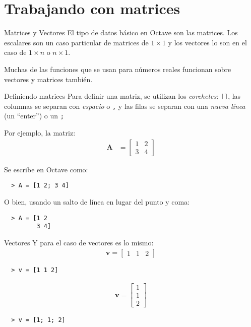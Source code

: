\section{Trabajando con matrices}

\begin{frame}{Matrices y Vectores}  %
  El tipo de datos básico en Octave son las matrices. Los escalares son un caso particular de matrices de $1\times 1$ y los vectores lo son en el caso de $1\times n$ o $n \times 1$.
  
  Muchas de las funciones que se usan para números reales funcionan sobre vectores y matrices también.
\end{frame}

\begin{frame}[fragile]{Definiendo matrices}
  Para definir una matriz, se utilizan los \emph{corchetes}: \verb![]!, las columnas se separan con \emph{espacio} o \verb!,! y las filas se separan con una \emph{nueva línea} (un ``enter'') o un \verb!;!

  Por ejemplo, la matriz:
  \begin{align*}
	  \mathbf{A} &= \left [ 
		  \begin{matrix}
			  1 & 2\\
			  3 & 4
		  \end{matrix}
	  \right]
  \end{align*}

  Se escribe en Octave como:

  \begin{lstlisting}
  > A = [1 2; 3 4]
  \end{lstlisting}
  
  O bien, usando un salto de línea en lugar del punto y coma:
  \begin{lstlisting}
  > A = [1 2
         3 4]
  \end{lstlisting}
\end{frame}

\begin{frame}[fragile]{Vectores}
  Y para el caso de vectores es lo mismo:
  \begin{align*}
      \mathbf{v} = \left[ \begin{matrix} 1 & 1 & 2\end{matrix} \right]
  \end{align*}

  \begin{lstlisting}
  > v = [1 1 2]
  \end{lstlisting}

  \begin{align*}
      \mathbf{v} = \left[ \begin{matrix} 1 \\ 1 \\ 2\end{matrix} \right]
  \end{align*}

  \begin{lstlisting}
  > v = [1; 1; 2]
  \end{lstlisting}
\end{frame}

